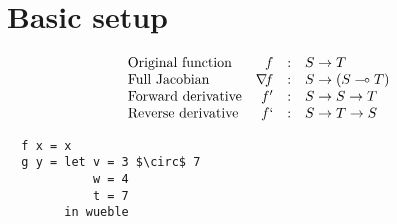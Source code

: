 \documentclass{article}
\renewcommand{\to}{\rightarrow}    %
\newcommand{\linto}{\multimap}   %
\newcommand{\grad}[1]{\nabla\! f}  %
\newcommand{\fwdD}[1]{f'}  %
\newcommand{\revD}[1]{f`}  %
\begin{document}
\section{Basic setup}

$$
\begin{array}{lrcl}
  \mbox{Original function}   & f        & : & S \to T \\
  \mbox{Full Jacobian}       & \grad{f} & : & S \to (S \linto T) \\
  \mbox{Forward derivative}  & \fwdD{f} & : & S \to S \to T \\
  \mbox{Reverse derivative}  & \revD{f} & : & S \to T \to S \\
\end{array}
$$

\begin{lstlisting}
  f x = x
  g y = let v = 3 $\circ$ 7
            w = 4
            t = 7
        in wueble
\end{lstlisting}
\end{document}
